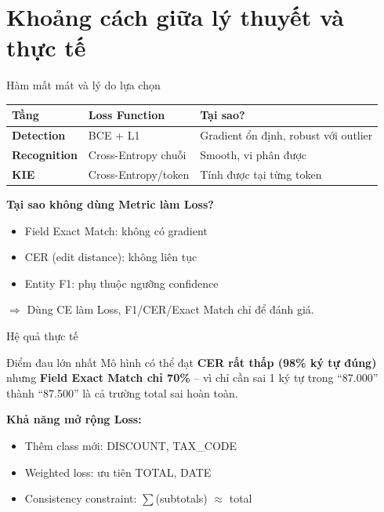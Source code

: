\documentclass[aspectratio=169, 10pt]{beamer}
\begin{document}
\section{Khoảng cách giữa lý thuyết và thực tế}

\begin{frame}{Hàm mất mát và lý do lựa chọn}
 \begin{center}
 \begin{tabularx}{\textwidth}{>{\bfseries}p{2.5cm}p{4cm}X}
 \toprule
 \textcolor{primary}{Tầng} & \textcolor{primary}{Loss Function} & \textcolor{primary}{Tại sao?} \\
 \midrule
 \rowcolor{accentlight}
 Detection & BCE + L1 & Gradient ổn định, robust với outlier \\
 Recognition & Cross-Entropy chuỗi & Smooth, vi phân được \\
 \rowcolor{accentlight}
 KIE & Cross-Entropy/token & Tính được tại từng token \\
 \bottomrule
 \end{tabularx}
 \end{center}
 \vspace{0.4cm}

 \textbf{Tại sao không dùng Metric làm Loss?}
 \begin{itemize}
 \item[\textcolor{danger}{$\bullet$}] Field Exact Match: không có gradient
 \item[\textcolor{danger}{$\bullet$}] CER (edit distance): không liên tục
 \item[\textcolor{danger}{$\bullet$}] Entity F1: phụ thuộc ngưỡng confidence
 \end{itemize}
 \vspace{0.2cm}
 \centering
 $\Rightarrow$ Dùng CE làm Loss, F1/CER/Exact Match chỉ để đánh giá.
\end{frame}

\begin{frame}{Hệ quả thực tế}
 \begin{alertblock}{Điểm đau lớn nhất}
 Mô hình có thể đạt \textbf{CER rất thấp (98\% ký tự đúng)} nhưng \textbf{Field Exact Match chỉ 70\%} -- vì chỉ cần sai 1 ký tự trong ``87.000'' thành ``87.500'' là cả trường total sai hoàn toàn.
 \end{alertblock}
 \vspace{0.3cm}

 \textbf{Khả năng mở rộng Loss:}
 \begin{itemize}
 \item[\textcolor{success}{$\bullet$}] Thêm class mới: DISCOUNT, TAX\_CODE
 \item[\textcolor{success}{$\bullet$}] Weighted loss: ưu tiên TOTAL, DATE
 \item[\textcolor{success}{$\bullet$}] Consistency constraint: $\sum$(subtotals) $\approx$ total
 \end{itemize}
\end{frame}
\end{document}
